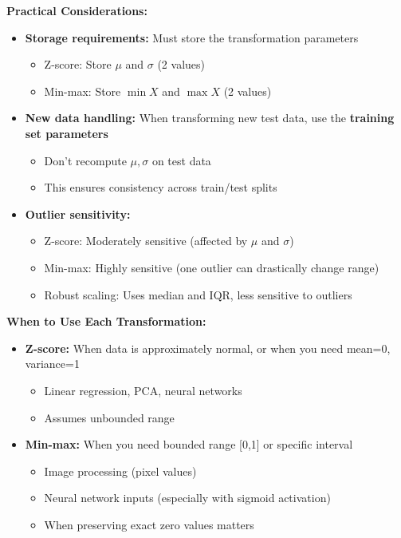 \documentclass[12pt]{article}
\begin{document}
\begin{explanation}
\textbf{Practical Considerations:}

\begin{itemize}
    \item \textbf{Storage requirements:} Must store the transformation parameters
    \begin{itemize}
        \item Z-score: Store \(\mu\) and \(\sigma\) (2 values)
        \item Min-max: Store \(\min X\) and \(\max X\) (2 values)
    \end{itemize}

    \item \textbf{New data handling:} When transforming new test data, use the \textbf{training set parameters}
    \begin{itemize}
        \item Don't recompute \(\mu, \sigma\) on test data
        \item This ensures consistency across train/test splits
    \end{itemize}

    \item \textbf{Outlier sensitivity:}
    \begin{itemize}
        \item Z-score: Moderately sensitive (affected by \(\mu\) and \(\sigma\))
        \item Min-max: Highly sensitive (one outlier can drastically change range)
        \item Robust scaling: Uses median and IQR, less sensitive to outliers
    \end{itemize}
\end{itemize}

\textbf{When to Use Each Transformation:}

\begin{itemize}
    \item \textbf{Z-score:} When data is approximately normal, or when you need mean=0, variance=1
    \begin{itemize}
        \item Linear regression, PCA, neural networks
        \item Assumes unbounded range
    \end{itemize}

    \item \textbf{Min-max:} When you need bounded range [0,1] or specific interval
    \begin{itemize}
        \item Image processing (pixel values)
        \item Neural network inputs (especially with sigmoid activation)
        \item When preserving exact zero values matters
    \end{itemize}


\end{itemize}
\end{explanation}
\end{document}
